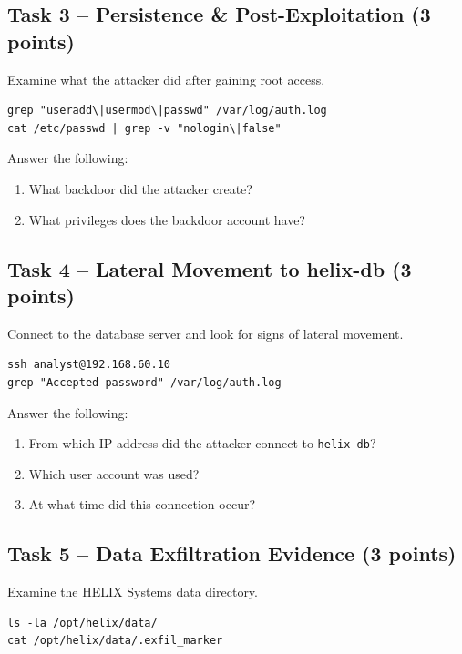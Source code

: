 \documentclass[a4paper, 12pt]{article}
\begin{document}
\subsection{Task 3 -- Persistence \& Post-Exploitation (3 points)}

Examine what the attacker did after gaining root access.

\begin{lstlisting}
grep "useradd\|usermod\|passwd" /var/log/auth.log
cat /etc/passwd | grep -v "nologin\|false"
\end{lstlisting}

Answer the following:
\begin{enumerate}[label=\alph*)]
    \item What backdoor did the attacker create?
    \item What privileges does the backdoor account have?
\end{enumerate}

\subsection{Task 4 -- Lateral Movement to helix-db (3 points)}

Connect to the database server and look for signs of lateral movement.

\begin{lstlisting}
ssh analyst@192.168.60.10
grep "Accepted password" /var/log/auth.log
\end{lstlisting}

Answer the following:
\begin{enumerate}[label=\alph*)]
    \item From which IP address did the attacker connect to \texttt{helix-db}?
    \item Which user account was used?
    \item At what time did this connection occur?
\end{enumerate}

\subsection{Task 5 -- Data Exfiltration Evidence (3 points)}

Examine the HELIX Systems data directory.

\begin{lstlisting}
ls -la /opt/helix/data/
cat /opt/helix/data/.exfil_marker
\end{lstlisting}
\end{document}
